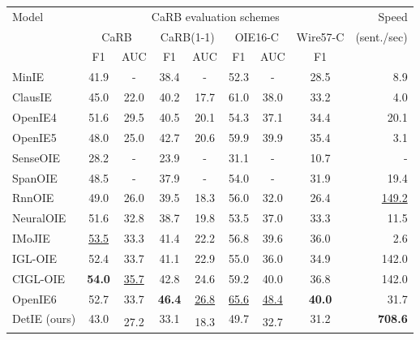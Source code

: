 \documentclass[letterpaper]{article} \usepackage{aaai22}  \usepackage{times}  \usepackage{helvet}  \usepackage{courier}  \usepackage[hyphens]{url}  \usepackage{graphicx} \usepackage{placeins}
\begin{document}
\begin{table*}[t]
    \centering\small
    \setlength{\tabcolsep}{7pt}
    \begin{tabular}{l|cc|cc|cc|c|r} \toprule
        \multirow{3}{*}{Model} & \multicolumn{7}{|c|}{CaRB evaluation schemes} & Speed \\
        \cline{2-8} 
        & \multicolumn{2}{c|}{CaRB} & \multicolumn{2}{c|}{CaRB(1-1)} & \multicolumn{2}{c|}{OIE16-C} & \multicolumn{1}{c|}{Wire57-C} & \multirow{2}{*}{(sent./sec)} \\
        \cline{2-8}
           & {F1} & {AUC} & {F1} & {AUC} & {F1} & {AUC} & {F1} &  \\ \hline
        MinIE~\cite{gashteovski2017minie}  & 41.9 & - & 38.4 & - & 52.3 & - & 28.5 & 8.9 \\
        ClausIE~\cite{del2013clausie}  & 45.0 & 22.0 & 40.2 & 17.7 & 61.0 & 38.0 & 33.2 & 4.0 \\
        OpenIE4~\cite{christensen2011analysis}  & 51.6 & 29.5 & 40.5 & 20.1 & 54.3 & 37.1 & 34.4 & 20.1 \\
        OpenIE5~\cite{saha2017bootstrapping,saha2018open}  & 48.0 & 25.0 & 42.7 & 20.6 & 59.9 & 39.9 & 35.4 & 3.1\\ \hline
    SenseOIE~\cite{roy-etal-2019-supervising}  & 28.2 & - & 23.9 & - & 31.1 & - & 10.7 & - \\
        SpanOIE~\cite{zhan2020span}  & 48.5 & - & 37.9 & - & 54.0 & - & 31.9 & 19.4 \\
        RnnOIE~\cite{stanovsky-etal-2018-supervised}  & 49.0 & 26.0 & 39.5 & 18.3 & 56.0 & 32.0 & 26.4 & \underline{149.2} \\
        NeuralOIE~\cite{cui-etal-2018-neural}  & 51.6 & 32.8 & 38.7 & 19.8 & 53.5 & 37.0 & 33.3 & 11.5\\ \hline
        IMoJIE~\cite{kolluru2020imojie}  & \underline{53.5} & 33.3 & 41.4 & 22.2 & 56.8 & 39.6 & 36.0 & 2.6 \\
        IGL-OIE~\cite{kolluru2020openie6} & 52.4 & 33.7 & 41.1 & 22.9 & 55.0 & 36.0 & 34.9 & 142.0 \\
        CIGL-OIE~\cite{kolluru2020openie6} & \textbf{54.0} & \underline{35.7} & 42.8 & 24.6 & 59.2 & 40.0 & 36.8 & 142.0 \\
        {OpenIE6}~\cite{kolluru2020openie6} & 52.7 & 33.7 & \textbf{46.4} & \underline{26.8} & \underline{65.6} & \underline{48.4} & \textbf{40.0} & 31.7 \\ \hline 
        DetIE (ours) & 43.0 & 27.2\textsuperscript{} & 33.1 & 18.3\textsuperscript{} & 49.7 & 32.7\textsuperscript{} & 31.2 & \textbf{708.6} \\ 

\end{tabular}
\end{table*}
\end{document}
